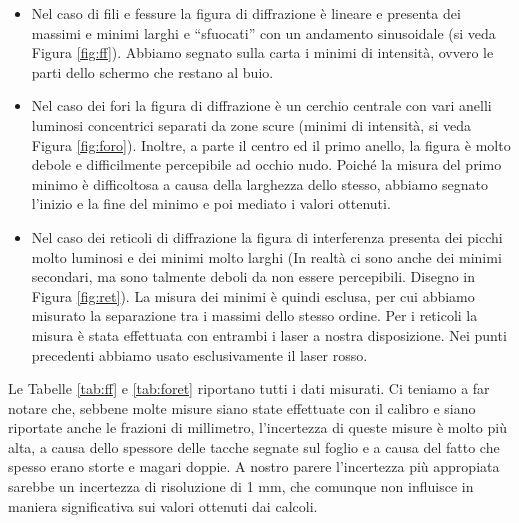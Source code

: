 \begin{itemize}
    \item{Nel caso di fili e fessure la figura di diffrazione è lineare e presenta dei massimi e minimi larghi e ``sfuocati'' con un andamento
        sinusoidale (si veda Figura \ref{fig:ff}). Abbiamo segnato sulla carta i minimi di intensità, ovvero le parti dello schermo
        che restano al buio.}
    \item{Nel caso dei fori la figura di diffrazione è un cerchio centrale con vari anelli luminosi concentrici separati da
        zone scure (minimi di intensità, si veda Figura \ref{fig:foro}). Inoltre, a parte il centro ed il primo anello,
        la figura è molto debole e difficilmente
        percepibile ad occhio nudo. Poiché la misura del primo minimo è difficoltosa a causa della larghezza dello stesso, abbiamo segnato
        l'inizio e la fine del minimo e poi mediato i valori ottenuti.}
    \item{Nel caso dei reticoli di diffrazione la figura di interferenza presenta dei picchi molto luminosi e dei minimi molto larghi
            (In realtà ci sono anche dei minimi secondari, ma sono talmente deboli da non essere percepibili. Disegno in Figura \ref{fig:ret}).
            La misura dei minimi è quindi esclusa, per cui abbiamo misurato la separazione tra i massimi dello stesso ordine.}
            Per i reticoli la misura è stata effettuata con entrambi i laser a nostra disposizione. Nei punti precedenti abbiamo
            usato esclusivamente il laser rosso.
\end{itemize}

Le Tabelle \ref{tab:ff} e \ref{tab:foret} riportano tutti i dati misurati. Ci teniamo a far notare
che, sebbene molte misure siano state effettuate con il calibro e siano riportate anche le frazioni di millimetro,
l'incertezza di queste misure è molto più alta, a causa dello spessore delle tacche segnate sul foglio e a causa del
fatto che spesso erano storte e magari doppie. A nostro parere l'incertezza più appropiata sarebbe un incertezza di
risoluzione di 1 mm, che comunque non influisce in maniera significativa sui valori ottenuti dai calcoli.


